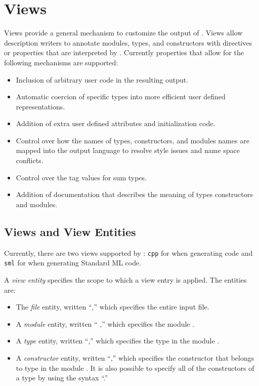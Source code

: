 %
\chapter{Views}
\label{chap:views}

Views provide a general mechanism to customize the output of
\asdlgen{}.
Views allow description writers to annotate modules, types, and constructors
with directives or properties that are interpreted by \asdlgen{}.
Currently \asdlgen{} properties that allow for the following mechanisms are
supported:
\begin{itemize}
  \item
    Inclusion of arbitrary user code in the resulting output.
  \item
    Automatic coercion of specific types into more efficient user
    defined representations.
  \item
    Addition of extra user defined attributes and initialization code.
  \item
    Control over how the names of types, constructors, and modules names
    are mapped into the output language to resolve style issues and name space
    conflicts.
  \item
    Control over the tag values for sum types.
  \item
    Addition of documentation that describes the meaning of types
    constructors and modules.
\end{itemize}%

\section{Views and View Entities}

Currently, there are two views supported by \asdlgen{}: \texttt{cpp} for
when generating \Cplusplus{} code and \texttt{sml} for when generating Standard
ML code.

A \emph{view entity} specifies the scope to which a view entry is applied.
The entities are:
\begin{itemize}
  \item
    The \emph{file} entity, written ``,'' which specifies
    the entire input file.
  \item
    A \emph{module} entity, written `` ,''
    which specifies the module .
  \item
    A \emph{type} entity, written ``,'' which
    specifies the type  in the module .
  \item
    A \emph{constructor} entity, written ``,'' which
    specifies the constructor  that belongs to type  in the module .
    It is also possible to specify all of the constructors of a type by using the
    syntax ``.''
\end{itemize}%

